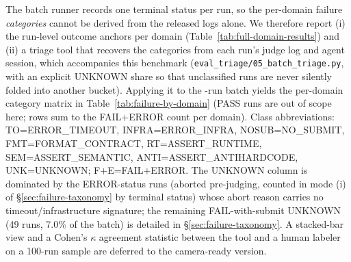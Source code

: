 The batch runner records one terminal status per run, so the per-domain failure
\emph{categories} cannot be derived from the released logs alone. We therefore
report (i) the run-level outcome anchors per domain (Table~\ref{tab:full-domain-results})
and (ii) a triage tool that recovers the categories from each run's judge log and
agent session, which accompanies this benchmark
(\texttt{eval\_triage/05\_batch\_triage.py}, with an explicit UNKNOWN share so that
unclassified runs are never silently folded into another bucket). Applying it to
the \Neval{}-run batch yields the per-domain category matrix in
Table~\ref{tab:failure-by-domain} (PASS runs are out of scope here; rows sum to
the FAIL+ERROR count per domain). Class abbreviations: TO=ERROR\_TIMEOUT,
INFRA=ERROR\_INFRA, NOSUB=NO\_SUBMIT, FMT=FORMAT\_CONTRACT, RT=ASSERT\_RUNTIME,
SEM=ASSERT\_SEMANTIC, ANTI=ASSERT\_ANTIHARDCODE, UNK=UNKNOWN; F+E=FAIL+ERROR.
The UNKNOWN column is dominated by the ERROR-status runs (aborted pre-judging,
counted in mode (i) of \S\ref{sec:failure-taxonomy} by terminal status) whose
abort reason carries no timeout/infrastructure signature; the remaining
FAIL-with-submit UNKNOWN (49 runs, 7.0\% of the batch) is detailed in
\S\ref{sec:failure-taxonomy}. A stacked-bar view and a Cohen's $\kappa$ agreement
statistic between the tool and a human labeler on a 100-run sample are deferred
to the camera-ready version.

